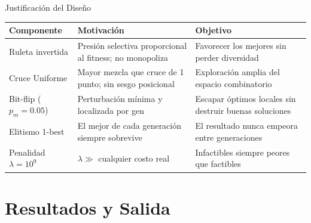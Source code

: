 \documentclass[aspectratio=169, 12pt]{beamer}
\newcommand{\acento}[1]{\textcolor{Verde}{\textbf{#1}}}
\newcommand{\acentob}[1]{\textcolor{Cian}{#1}}
\newcommand{\gris}[1]{\textcolor{GrisAzul}{#1}}
\begin{document}
\begin{frame}{Justificación del Diseño}
  \begin{center}
  \renewcommand{\arraystretch}{1.05}
  \footnotesize
  \begin{tabular}{p{2.3cm} p{3.9cm} p{3.9cm}}
    \toprule
    \acentob{Componente} & \acento{Motivación} & \gris{Objetivo} \\
    \midrule
    Ruleta invertida &
      Presión selectiva proporcional al fitness; no monopoliza &
      Favorecer los mejores sin perder diversidad \\
    Cruce Uniforme &
      Mayor mezcla que cruce de 1 punto; sin sesgo posicional &
      Exploración amplia del espacio combinatorio \\
    Bit-flip ($p_m{=}0.05$) &
      Perturbación mínima y localizada por gen &
      Escapar óptimos locales sin destruir buenas soluciones \\
    Elitismo 1-best &
      El mejor de cada generación siempre sobrevive &
      El resultado nunca empeora entre generaciones \\
    Penalidad $\lambda{=}10^9$ &
      $\lambda \gg$ cualquier costo real &
      Infactibles siempre peores que factibles \\
    \bottomrule
  \end{tabular}
  \end{center}
\end{frame}

\section{Resultados y Salida}
\end{document}
